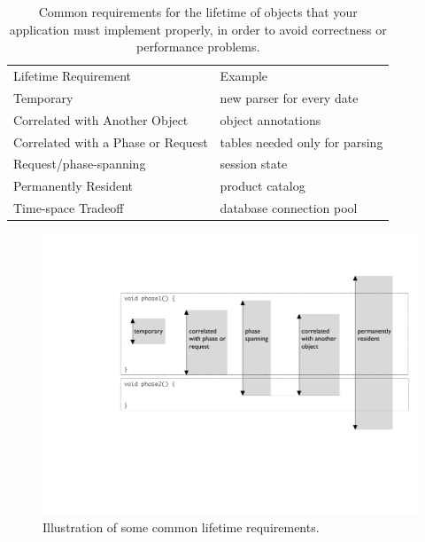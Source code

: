 \begin{table}
\centering
	\begin{tabular}{ll}
	\toprule
	   Lifetime Requirement & Example \\ \cmidrule(r){1-1} \cmidrule(l){2-2}
	  Temporary & new parser for every date
	\\
	Correlated with Another Object & object annotations
	\\
	Correlated with a Phase or Request & tables needed only for parsing
	\\
	Request/phase-spanning & session state 
	\\
	 Permanently Resident & product catalog
	\\
	 Time-space Tradeoff & database connection pool
	  \\
	\bottomrule
	\end{tabular}
	\caption{Common requirements for the lifetime of objects that your
	application must implement properly, in order to avoid correctness or
	performance problems.}
	\label{tab:five-lifetimes}
\end{table}

\begin{figure}
\centering
\includegraphics[width=\textwidth]{part4/Figures/requirements}
\caption{Illustration of some common lifetime requirements.}
\label{fig:five-lifetimes}
\end{figure}

